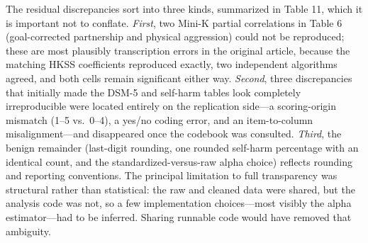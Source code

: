 \documentclass[
  english,
  man,floatsintext]{apa6}
\begin{document}
The residual discrepancies sort into three kinds, summarized in Table 11, which it is important not to conflate. \emph{First}, two Mini-K partial correlations in Table 6 (goal-corrected partnership and physical aggression) could not be reproduced; these are most plausibly transcription errors in the original article, because the matching HKSS coefficients reproduced exactly, two independent algorithms agreed, and both cells remain significant either way. \emph{Second}, three discrepancies that initially made the DSM-5 and self-harm tables look completely irreproducible were located entirely on the replication side---a scoring-origin mismatch (1--5 vs.~0--4), a yes/no coding error, and an item-to-column misalignment---and disappeared once the codebook was consulted. \emph{Third}, the benign remainder (last-digit rounding, one rounded self-harm percentage with an identical count, and the standardized-versus-raw alpha choice) reflects rounding and reporting conventions. The principal limitation to full transparency was structural rather than statistical: the raw and cleaned data were shared, but the analysis code was not, so a few implementation choices---most visibly the alpha estimator---had to be inferred. Sharing runnable code would have removed that ambiguity.
\end{document}

